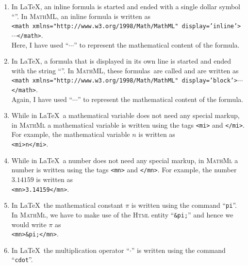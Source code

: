 \begin{enumerate}
\item In \LaTeX, an inline formula is started and ended with a single dollar symbol
      ``\texttt{}''.  
      In \textsc{MathML}, an inline formula is written as
      \\[0.2cm]
      \hspace*{1.3cm}
      \texttt{<math xmlns="http://www.w3.org/1998/Math/MathML" display='inline'>$\cdots$</math>}.
      \\[0.2cm]
      Here, I have used ``$\cdots$'' to represent the mathematical content of the formula.
\item In \LaTeX, a formula that is displayed in its own line is started and ended with the string
      ``\texttt{}''.  
      In \textsc{MathML}, these formulas\ are called  and are written as
      \\[0.2cm]
      \hspace*{1.3cm}
      \texttt{<math xmlns="http://www.w3.org/1998/Math/MathML" display='block'>$\cdots$</math>}.
      \\[0.2cm]
      Again, I have used ``$\cdots$'' to represent the mathematical content of the formula.
\item While in \LaTeX\ a mathematical variable does not need any special markup, in \textsc{MathMl}
      a mathematical variable is written using the tags 
      \texttt{<mi>} and \texttt{</mi>}.  For example, the mathematical variable $n$ is written as    
      \\[0.2cm]
      \hspace*{1.3cm}
      \texttt{<mi>n</mi>}.
\item While in \LaTeX\ a number does not need any special markup, in \textsc{MathMl}
      a number is written using the tags 
      \texttt{<mn>} and \texttt{</mn>}.  For example, the number $3.14159$ is written as    
      \\[0.2cm]
      \hspace*{1.3cm}
      \texttt{<mn>3.14159</mn>}.
\item In \LaTeX\ the mathematical constant $\pi$ is written using the command ``\texttt{pi}''.
      In \textsc{MathMl}, we have to make use of the \textsc{Html} entity ``\texttt{\&pi;}'' and
      hence we would write $\pi$ as
      \\[0.2cm]
      \hspace*{1.3cm}
      \texttt{<mn>\&pi;</mn>}.
\item In \LaTeX\ the multiplication operator ``$\cdot$'' is written using the command ``\texttt{cdot}''.

\end{enumerate}

